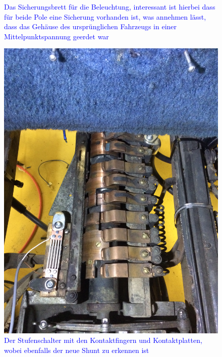 \begin{landscape}
\begin{figure}[h]
	\caption{\textcolor{blue}{Das Sicherungsbrett für die Beleuchtung, interessant ist hierbei dass für beide Pole eine Sicherung vorhanden ist, was annehmen lässt, dass das Gehäuse des ursprünglichen Fahrzeugs in einer Mittelpunktspannung geerdet war}}
	\label{fig:Sicherungsbrett_Beleuchtung}
\end{figure}
\begin{figure}[h]
	\centering
		\includegraphics[width=1.30\textwidth]{images/Anhang/Stufenschalter.jpg}
	\caption{\textcolor{blue}{Der Stufenschalter mit den Kontaktfingern und Kontaktplatten, wobei ebenfalls der neue Shunt zu erkennen ist}}
	\label{fig:Stufenschalter_Anhang}
\end{figure}
\begin{figure}[h]
	\centering

\end{figure}
\end{landscape}
